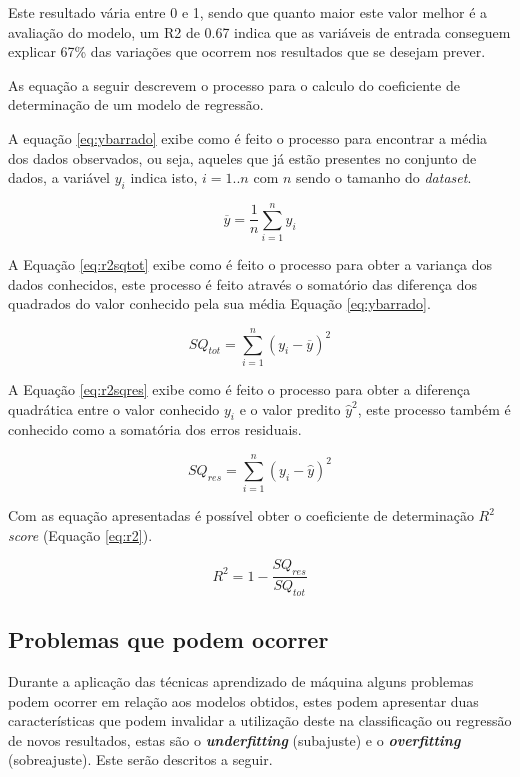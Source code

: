 \documentclass[
12pt,				%
oneside,			%
a4paper,			%
english,			%
french,				%
spanish,			%
brazil				%
]{abntex2}
\begin{document}
Este resultado vária entre 0 e 1, sendo que quanto maior este valor melhor é a avaliação do modelo, um R2 de 0.67 indica que as variáveis de entrada conseguem explicar 67\% das variações que ocorrem nos resultados que se desejam prever. 

As equação a seguir descrevem o processo para o calculo do coeficiente de determinação de um modelo de regressão.

A equação \ref{eq:ybarrado} exibe como é feito o processo para encontrar a média dos dados observados, ou seja, aqueles que já estão presentes no conjunto de dados, a variável $y_{i}$ indica isto, $i=1..n$ com $n$ sendo o tamanho do \textit{dataset}. 

\begin{equation}
\overline{y} = \frac{1}{n} \sum_{i=1}^{n}y_{i} 
\label{eq:ybarrado}
\end{equation} 

A Equação \ref{eq:r2sqtot} exibe como é feito o processo para obter a variança dos dados conhecidos, este processo é feito através o somatório das diferença dos quadrados do valor conhecido pela sua média Equação \ref{eq:ybarrado}.
 
\begin{equation}
SQ_{tot} = \sum_{i=1}^{n}(y_{i}-\overline{y})^{2} 
\label{eq:r2sqtot}
\end{equation} 

A Equação \ref{eq:r2sqres} exibe como é feito o processo para obter a diferença quadrática entre o valor conhecido $y_{i}$ e o valor predito $\hat{y}^{2}$, este processo também é conhecido como a somatória dos erros residuais.

\begin{equation}
SQ_{res} = \sum_{i=1}^{n}(y_{i}-\hat{y})^{2} 
\label{eq:r2sqres}
\end{equation} 

Com as equação apresentadas é possível obter o coeficiente de determinação $R^2$ \textit{score} (Equação \ref{eq:r2}).

\begin{equation}
R^2 = 1 - \frac{SQ_{res}}{SQ_{tot}}  
\label{eq:r2}
\end{equation} 


\subsection{Problemas que podem ocorrer}

Durante a aplicação das técnicas aprendizado de máquina alguns problemas podem ocorrer em relação aos modelos obtidos, estes podem apresentar duas características que podem invalidar a utilização deste na classificação ou regressão de novos resultados, estas são o \textit{\textbf{underfitting}} (subajuste) e o \textit{\textbf{overfitting}} (sobreajuste). Este serão descritos a seguir.
\end{document}

